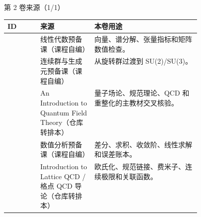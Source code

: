\begin{frame}[t]{第 2 卷来源（1/1）}
\scriptsize\begin{tabularx}{\linewidth}{p{0.17\linewidth}p{0.28\linewidth}Y}
\toprule ID & 来源 & 本卷用途\\\midrule
{} & 线性代数预备课（课程自编） & 向量、谱分解、张量指标和矩阵数值检查。\\
 & 连续群与生成元预备课（课程自编） & 从旋转群过渡到 SU(2)/\allowbreak{}SU(3)。\\
 & An Introduction to Quantum Field Theory（仓库转排本） & 量子场论、规范理论、QCD 和重整化的主教材交叉核验。\\
 & 数值分析预备课（课程自编） & 差分、求积、收敛阶、线性求解和误差账本。\\
 & Introduction to Lattice QCD /\allowbreak{} 格点 QCD 导论（仓库转排本） & 欧氏化、规范链接、费米子、连续极限和关联函数。\\
\bottomrule\end{tabularx}\end{frame}

